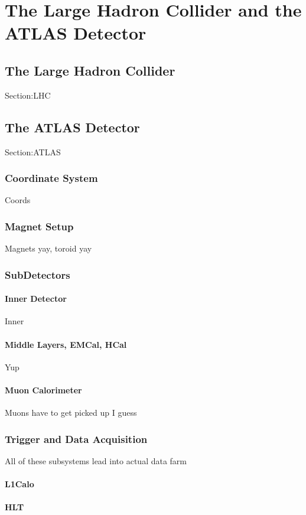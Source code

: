
\chapter{The Large Hadron Collider and the ATLAS Detector}
\label{ch:LHCDetector}

\section{The Large Hadron Collider}
Section:LHC

\section{The ATLAS Detector}
Section:ATLAS
\subsection{Coordinate System}
Coords
\subsection{Magnet Setup}
Magnets yay, toroid yay

\subsection{SubDetectors}
\subsubsection{Inner Detector}
Inner
\subsubsection{Middle Layers, EMCal, HCal}
Yup
\subsubsection{Muon Calorimeter}
Muons have to get picked up I guess
\subsection{Trigger and Data Acquisition}
All of these subsystems lead into actual data farm
\subsubsection{L1Calo}
\subsubsection{HLT}
